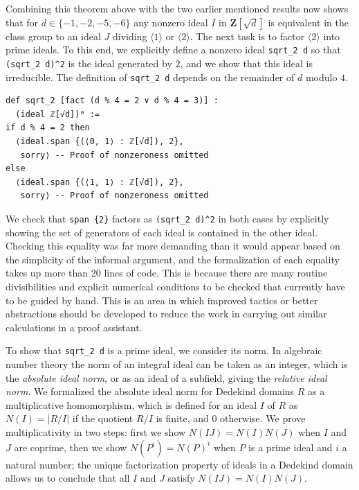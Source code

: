 \documentclass[sigplan,10pt,nonacm,
screen]{acmart} \settopmatter{printfolios=true,printccs=false,printacmref=false}
\newcommand{\ZZ}{\mathbf{Z}}
\begin{document}
Combining this theorem above with the two earlier mentioned results
now shows that for $d\in \{-1,-2,-5,-6\}$ any nonzero ideal $I$ in $\ZZ[\sqrt{d}]$ is equivalent in the class group to an ideal $J$ dividing $\langle 1 \rangle$ or $\langle 2 \rangle$.
The next task is to factor $\langle 2 \rangle$ into prime ideals.
To this end, we explicitly define a nonzero ideal \lstinline{sqrt_2 d} so that \lstinline!(sqrt_2 d)^2! is the ideal generated by $2$,
and we show that this ideal is irreducible.
The definition of \lstinline{sqrt_2 d} depends on the remainder of $d$ modulo $4$.
\begin{lstlisting}
def sqrt_2 [fact (d % 4 = 2 ∨ d % 4 = 3)] :
  (ideal ℤ[√d])⁰ :=
if d % 4 = 2 then
  ⟨ideal.span {(⟨0, 1⟩ : ℤ[√d]), 2},
   sorry⟩ -- Proof of nonzeroness omitted
else
  ⟨ideal.span {(⟨1, 1⟩ : ℤ[√d]), 2},
   sorry⟩ -- Proof of nonzeroness omitted
\end{lstlisting}
We check that \lstinline!span {2}! factors as \lstinline{(sqrt_2 d)^2} in both cases by explicitly showing the set of generators of each ideal is contained in the other ideal.
Checking this equality was far more demanding than it would appear based on the simplicity of the informal argument, and the formalization of each equality takes up more than 20 lines of code.
This is because there are many routine divisibilities and explicit numerical conditions to be checked that currently have to be guided by hand.
This is an area in which improved tactics or better abstractions should be developed to reduce the work in carrying out similar calculations in a proof assistant.

To show that \lstinline{sqrt_2 d} is a prime ideal, we consider its norm.
In algebraic number theory the norm of an integral ideal can be taken as an integer, which is the \emph{absolute ideal norm},
or as an ideal of a subfield, giving the \emph{relative ideal norm}.
We formalized the absolute ideal norm for Dedekind domains $R$ as a multiplicative homomorphism, which is defined for an ideal $I$ of $R$ as $N(I) = \left|R / I\right|$ if the quotient $R/I$ is finite, and $0$ otherwise.
We prove multiplicativity in two steps: first we show $N(IJ) = N(I) N(J)$ when $I$ and $J$ are coprime,
then we show $N(P^i) = N(P)^i$ when $P$ is a prime ideal and $i$ a natural number;
the unique factorization property of ideals in a Dedekind domain allows us to conclude that all $I$ and $J$ satisfy $N(IJ) = N(I) N(J)$.
\end{document}
